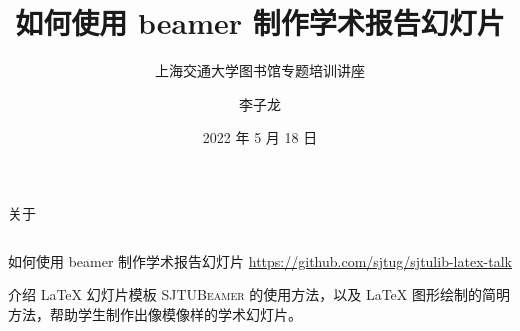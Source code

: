 
\title{如何使用 beamer 制作学术报告幻灯片}
\subtitle{上海交通大学图书馆专题培训讲座}
\author{李子龙}
\date{2022 年 5 月 18 日}
\subject{LaTeX, 幻灯片制作, SJTUBeamer}
\maketitle

\providecommand{\TikZ}{Ti\textit{k}Z}
\providecommand{\pgf}{\textsc{pgf}}
\providecommand{\pgfplots}{\textsc{pgfplots}}
\providecommand{\pgfplotstable}{\textsc{PgfplotsTable}}

\begin{frame}{关于}
  \begin{columns}[c]
  \begin{column}{.7\textwidth}
    \begin{block}{如何使用 beamer 制作学术报告幻灯片}
    \alert{\url{https://github.com/sjtug/sjtulib-latex-talk}}
    
    \begin{flushleft}
      \small 介绍 \LaTeX{} 幻灯片模板 \textsc{SJTUBeamer} 的使用方法，以及 \LaTeX{} 图形绘制的简明方法，帮助学生制作出像模像样的学术幻灯片。
    \end{flushleft}


\end{block}
\end{column}
\end{columns}
\end{frame}
